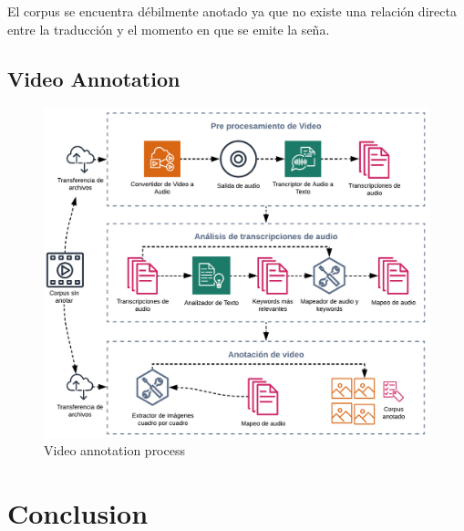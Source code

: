 \documentclass[twocolumn]{article}
\begin{document}
El corpus se encuentra débilmente anotado ya que no existe una relación directa entre la traducción y el momento en que se emite la seña.

\subsection{Video Annotation}
\begin{figure}[ht!]
\includegraphics[width=\linewidth]{video-annotation-pipeline.png}
\caption{Video annotation process}
\end{figure}
\section{Conclusion}



\end{document}
